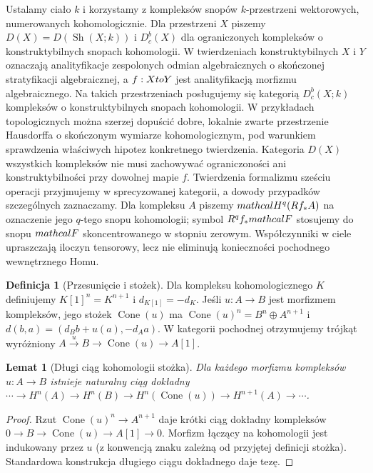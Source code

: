 \documentclass[11pt,a4paper,oneside]{report}
\theoremstyle{plain}
\newtheorem{lemat}[twierdzenie]{Lemat}
\theoremstyle{definition}
\newtheorem{definicja}[twierdzenie]{Definicja}
\theoremstyle{remark}
\begin{document}
Ustalamy ciało $k$ i korzystamy z kompleksów snopów $k$-przestrzeni
wektorowych, numerowanych kohomologicznie. Dla przestrzeni $X$
piszemy $D(X)=D(\operatorname{Sh}(X;k))$ i $D^b_c(X)$ dla
ograniczonych kompleksów o konstruktybilnych snopach kohomologii.
W twierdzeniach konstruktybilnych $X$ i $Y$ oznaczają
analityfikacje zespolonych odmian algebraicznych o skończonej
stratyfikacji algebraicznej, a $f:X\\to Y$ jest analityfikacją
morfizmu algebraicznego. Na takich przestrzeniach posługujemy się
kategorią $D^b_c(X;k)$ kompleksów o konstruktybilnych snopach
kohomologii. W przykładach topologicznych można szerzej dopuścić
dobre, lokalnie zwarte przestrzenie Hausdorffa o skończonym wymiarze
kohomologicznym, pod warunkiem sprawdzenia właściwych hipotez
konkretnego twierdzenia. Kategoria $D(X)$ wszystkich kompleksów nie
musi zachowywać ograniczoności ani konstruktybilności przy dowolnej
mapie $f$. Twierdzenia formalizmu sześciu operacji przyjmujemy w
sprecyzowanej kategorii, a dowody przypadków szczególnych zaznaczamy.
Dla kompleksu $A$ piszemy $\\mathcal H^q(Rf_*A)$ na oznaczenie
jego $q$-tego snopu kohomologii; symbol $R^qf_*\\mathcal F$
stosujemy do snopu $\\mathcal F$ skoncentrowanego w stopniu zerowym. Współczynniki w ciele upraszczają
iloczyn tensorowy, lecz nie eliminują konieczności pochodnego
wewnętrznego Homu.

\begin{definicja}[Przesunięcie i stożek]
Dla kompleksu kohomologicznego $K$ definiujemy $K[1]^n=K^{n+1}$
i $d_{K[1]}=-d_K$. Jeśli $u:A\to B$ jest morfizmem kompleksów,
jego stożek $\operatorname{Cone}(u)$ ma
$\operatorname{Cone}(u)^n=B^n\oplus A^{n+1}$ i
$d(b,a)=(d_Bb+u(a),-d_Aa)$. W kategorii pochodnej otrzymujemy
trójkąt wyróżniony
$A\xrightarrow{u}B\to\operatorname{Cone}(u)\to A[1]$.
\end{definicja}
\begin{lemat}[Długi ciąg kohomologii stożka]
Dla każdego morfizmu kompleksów $u:A\to B$ istnieje naturalny
ciąg dokładny
$\cdots\to H^n(A)\to H^n(B)\to
H^n(\operatorname{Cone}(u))\to H^{n+1}(A)\to\cdots$.
\end{lemat}
\begin{proof}
Rzut $\operatorname{Cone}(u)^n\to A^{n+1}$ daje krótki ciąg
dokładny kompleksów $0\to B\to\operatorname{Cone}(u)\to A[1]\to0$.
Morfizm łączący na kohomologii jest indukowany przez $u$ (z
konwencją znaku zależną od przyjętej definicji stożka). Standardowa
konstrukcja długiego ciągu dokładnego daje tezę.
\end{proof}
\end{document}
